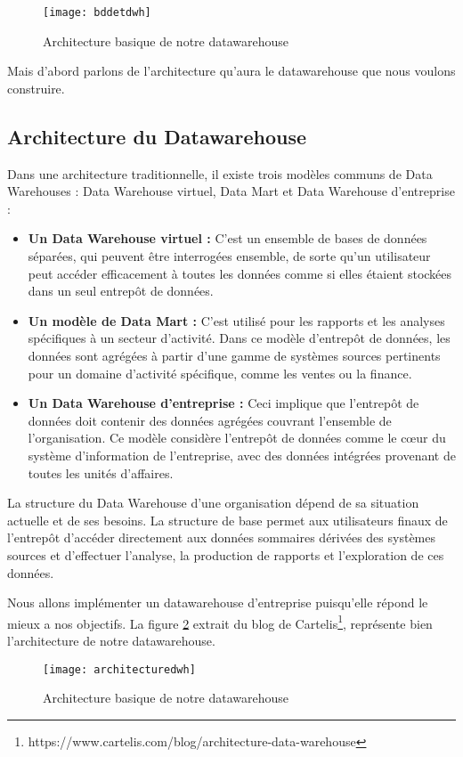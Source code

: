 \begin{figure}[H]
    \centering
    \texttt{[image: bddetdwh]}
    \caption{Architecture basique de notre datawarehouse}
    \label{fig:bddetdwh}
\end{figure}

Mais d'abord parlons de l'architecture qu'aura le datawarehouse que nous voulons construire.

\subsection{Architecture du Datawarehouse}
Dans une architecture traditionnelle, il existe trois modèles communs de Data Warehouses : Data Warehouse virtuel, Data Mart et Data Warehouse d’entreprise :
\begin{itemize}
    \item \textbf{Un Data Warehouse virtuel :} C'est un ensemble de bases de données séparées, qui peuvent être interrogées ensemble, de sorte qu’un utilisateur peut accéder efficacement à toutes les données comme si elles étaient stockées dans un seul entrepôt de données.
    \item \textbf{Un modèle de Data Mart :}  C'est utilisé pour les rapports et les analyses spécifiques à un secteur d’activité. Dans ce modèle d’entrepôt de données, les données sont agrégées à partir d’une gamme de systèmes sources pertinents pour un domaine d’activité spécifique, comme les ventes ou la finance.
    \item \textbf{Un Data Warehouse d’entreprise :} Ceci implique que l’entrepôt de données doit contenir des données agrégées couvrant l’ensemble de l’organisation. Ce modèle considère l’entrepôt de données comme le cœur du système d’information de l’entreprise, avec des données intégrées provenant de toutes les unités d’affaires.
\end{itemize}

La structure du Data Warehouse d’une organisation dépend de sa situation actuelle et de ses besoins. La structure de base permet aux utilisateurs finaux de l’entrepôt d’accéder directement aux données sommaires dérivées des systèmes sources et d’effectuer l’analyse, la production de rapports et l’exploration de ces données. 

Nous allons implémenter un datawarehouse d'entreprise puisqu'elle répond le mieux a nos objectifs. La figure \ref{fig:architecturedwh} extrait du blog de Cartelis\footnote{https://www.cartelis.com/blog/architecture-data-warehouse}, représente bien l'architecture de notre datawarehouse.
\begin{figure}[H]
    \centering
    \texttt{[image: architecturedwh]}
    \caption{Architecture basique de notre datawarehouse}
    \label{fig:architecturedwh}
\end{figure}

